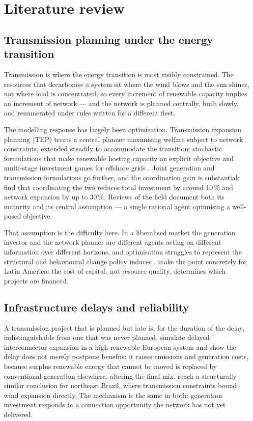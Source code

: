 \section{Literature review}
\label{sec:literature}

\subsection{Transmission planning under the energy transition}
\label{sec:lit:planning}

Transmission is where the energy transition is most visibly constrained. The resources
that decarbonise a system sit where the wind blows and the sun shines, not where load
is concentrated, so every increment of renewable capacity implies an increment of
network --- and the network is planned centrally, built slowly, and remunerated under
rules written for a different fleet.

The modelling response has largely been optimisation. Transmission expansion
planning (TEP) treats a central planner maximising welfare subject to network
constraints, extended steadily to accommodate the transition: stochastic
formulations that make renewable hosting capacity an explicit objective
\citep{valipour2026} and multi-stage investment games for offshore grids
\citep{tao2025}. Joint generation and transmission formulations go further, and the
coordination gain is substantial: \citet{herding2024} find that coordinating the two
reduces total investment by around 10\,\% and network expansion by up to 30\,\%.
Reviews of the field \citep{gacitua2018,babatunde2020} document both its maturity
and its central assumption --- a single rational agent optimising a well-posed
objective.

That assumption is the difficulty here. In a liberalised market the generation investor
and the network planner are different agents acting on different information over
different horizons, and optimisation struggles to represent the structural and
behavioural change policy induces \citep{dyner2001}. \citet{delrio2026} make the point
concretely for Latin America: the cost of capital, not resource quality, determines
which projects are financed.

\subsection{Infrastructure delays and reliability}
\label{sec:lit:delays}

A transmission project that is planned but late is, for the duration of the delay,
indistinguishable from one that was never planned. \citet{ritter2019} simulate
delayed interconnector expansion in a high-renewable European system and show the
delay does not merely postpone benefits: it raises emissions and generation costs,
because surplus renewable energy that cannot be moved is replaced by conventional
generation elsewhere, altering the final mix. \citet{herrera2019} reach a
structurally similar conclusion for northeast Brazil, where transmission constraints
bound wind expansion directly. The mechanism is the same in both: generation
investment responds to a connection opportunity the network has not yet delivered.

